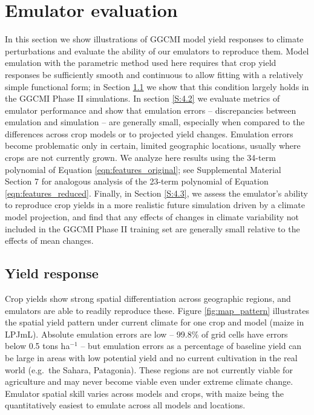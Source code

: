 \documentclass[gmd, manuscript]{copernicus} %
\begin{document}
\section{Emulator evaluation}
\label{S:4}
In this section we show illustrations of GGCMI model yield responses to climate perturbations  and evaluate the ability of our emulators to reproduce them.   
Model emulation with the parametric method used here requires that crop yield responses be sufficiently smooth and continuous to allow fitting with a relatively simple functional form; in Section \ref{S:4.1} we show that this condition largely holds in the GGCMI Phase II simulations. 
In section \ref{S:4.2} we evaluate metrics of emulator performance and show that emulation errors -- discrepancies between emulation and simulation -- are generally small, especially when compared to the differences across crop models or to projected yield changes. 
Emulation errors become problematic only in certain, limited geographic locations, usually where crops are not currently grown. 
We analyze here results using the 34-term polynomial of Equation \ref{eqn:features_original}; see Supplemental Material Section 7 for analogous analysis of the 23-term polynomial of Equation \ref{eqn:features_reduced}.
Finally, in Section \ref{S:4.3}, we assess the emulator's ability to reproduce crop yields in a more realistic future simulation driven by a climate model projection, and find that any effects of changes in climate variability not included in the GGCMI Phase II training set are generally small relative to the effects of mean changes.

\subsection{Yield response}
\label{S:4.1}
Crop yields show strong spatial differentiation across geographic regions, and emulators are able to readily reproduce these. Figure \ref{fig:map_pattern} illustrates the spatial yield pattern under current climate for one crop and model (maize in LPJmL). Absolute emulation errors are low --  99.8\% of grid cells have errors below 0.5 tons ha$^{-1}$ -- but 
emulation errors as a percentage of baseline yield can be large in areas with low potential yield and no current cultivation in the real world (e.g.\ the Sahara, Patagonia).
These regions are not currently viable for agriculture and may never become viable even under extreme climate change.  
Emulator spatial skill varies across models and crops, with maize being the quantitatively easiest to emulate across all models and locations.
\end{document}
